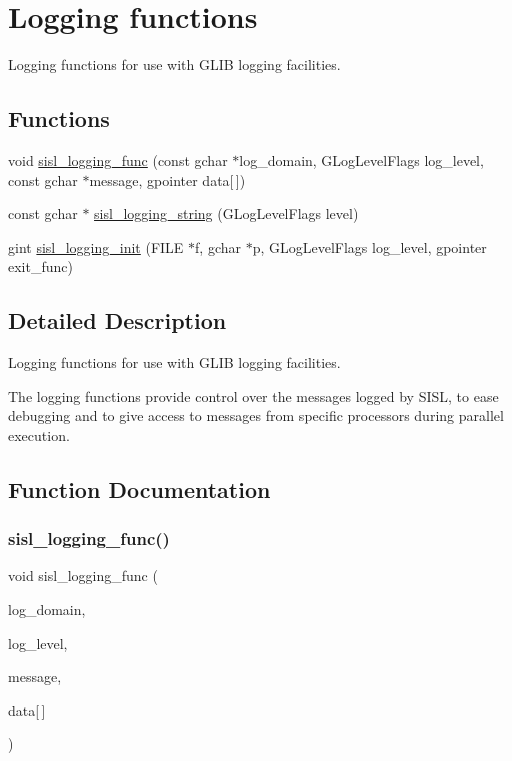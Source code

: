 \hypertarget{group__logging}{}\section{Logging functions}
\label{group__logging}


Logging functions for use with G\+L\+IB logging facilities.  


\subsection*{Functions}
\begin{DoxyCompactItemize}
\item 
void \mbox{\hyperlink{group__logging_ga723c3602e397154cb8ec8de6b4e5199a}{sisl\+\_\+logging\+\_\+func}} (const gchar $\ast$log\+\_\+domain, G\+Log\+Level\+Flags log\+\_\+level, const gchar $\ast$message, gpointer data\mbox{[}$\,$\mbox{]})
\item 
const gchar $\ast$ \mbox{\hyperlink{group__logging_ga57df9dc0bb01da0f0d992349b5f895e1}{sisl\+\_\+logging\+\_\+string}} (G\+Log\+Level\+Flags level)
\item 
gint \mbox{\hyperlink{group__logging_gae1950640d392b09eeac5a171b4754e17}{sisl\+\_\+logging\+\_\+init}} (F\+I\+LE $\ast$f, gchar $\ast$p, G\+Log\+Level\+Flags log\+\_\+level, gpointer exit\+\_\+func)
\end{DoxyCompactItemize}


\subsection{Detailed Description}
Logging functions for use with G\+L\+IB logging facilities. 

The logging functions provide control over the messages logged by S\+I\+SL, to ease debugging and to give access to messages from specific processors during parallel execution. 

\subsection{Function Documentation}
\mbox{\label{group__logging_ga723c3602e397154cb8ec8de6b4e5199a}} 
\subsubsection{\texorpdfstring{sisl\+\_\+logging\+\_\+func()}{sisl\_logging\_func()}}
{\footnotesize\ttfamily void sisl\+\_\+logging\+\_\+func (\begin{DoxyParamCaption}\item[{const gchar $\ast$}]{log\+\_\+domain,  }\item[{G\+Log\+Level\+Flags}]{log\+\_\+level,  }\item[{const gchar $\ast$}]{message,  }\item[{gpointer}]{data\mbox{[}$\,$\mbox{]} }\end{DoxyParamCaption})}

